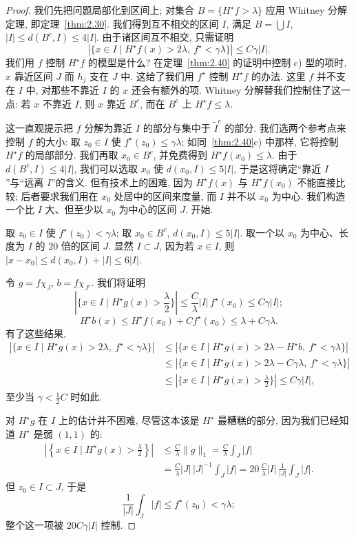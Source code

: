 \begin{proof}
我们先把问题局部化到区间上; 对集合 $B=\{H^{\star}f>\lambda\}$ 应用 Whitney 分解定理, 即定理~\ref{thm:2.30}. 我们得到互不相交的区间 $I$, 满足 $B=\bigcup I$, $|I|\leq d(B^{c},I)\leq 4|I|$. 由于诸区间互不相交, 只需证明
\[
|\{x\in I \mid H^{\star}f(x)>2\lambda,\ f^{\star}<\gamma\lambda\}|\leq C\gamma|I|.
\]
我们用 $f$ 控制 $H^{\star}f$ 的模型是什么? 在定理~\ref{thm:2.40} 的证明中控制 c) 型的项时, $x$ 靠近区间 $J$ 而 $h_j$ 支在 $J$ 中. 这给了我们用 $f^{\star}$ 控制 $H^{\star}f$ 的办法. 这里 $f$ 并不支在 $I$ 中, 对那些不靠近 $I$ 的 $x$ 还会有额外的项. Whitney 分解替我们控制住了这一点: 若 $x$ 不靠近 $I$, 则 $x$ 靠近 $B^{c}$, 而在 $B^{c}$ 上 $H^{\star}f\leq\lambda$.

这一直观提示把 $f$ 分解为靠近 $I$ 的部分与集中于 $\tilde{I}^{c}$ 的部分. 我们选两个参考点来控制 $f$ 的大小: 取 $z_0\in I$ 使 $f^{\star}(z_0)\leq\gamma\lambda$; 如同~\ref*{thm:2.40}c) 中那样, 它将控制 $H^{\star}f$ 的局部部分. 我们再取 $x_0\in B^{c}$, 并免费得到 $H^{\star}f(x_0)\leq\lambda$. 由于 $d(B^{c},I)\leq 4|I|$, 我们可以选取 $x_0$ 使 $d(x_0,I)\leq 5|I|$, 于是这将确定``靠近 $I$''与``远离 $I$''的含义. 但有技术上的困难, 因为 $H^{\star}f(x)$ 与 $H^{\star}f(x_0)$ 不能直接比较; 后者要求我们用在 $x_{0}$ 处居中的区间来度量, 而 $I$ 并不以 $x_0$ 为中心. 我们构造一个比 $I$ 大、但至少以 $x_{0}$ 为中心的区间 $J$. 开始.

取 $z_0\in I$ 使 $f^{\star}(z_0)<\gamma\lambda$; 取 $x_0\in B^{c}$, $d(x_0,I)\leq 5|I|$. 取一个以 $x_0$ 为中心、长度为 $I$ 的 $20$ 倍的区间 $J$. 显然 $I\subset J$, 因为若 $x\in I$, 则 $|x-x_{0}|\leq d(x_{0},I)+|I|\leq 6|I|$.

令 $g=f\chi_J$, $b=f\chi_{J^{c}}$. 我们将证明
\[
\left|\{x\in I \mid H^{\star}g(x)>\frac{\lambda}{2}\}\right|\leq\frac{C}{\lambda}|I|\,f^{\star}(x_{0})\leq C\gamma|I|;
\]
\[
H^{\star}b(x)\leq H^{\star}f(x_{0})+C f^{\star}(x_{0})\leq\lambda+C\gamma\lambda.
\]
有了这些结果,
\begin{align*}
|\{x\in I \mid H^{\star}g(x)>2\lambda,\ f^{\star}<\gamma\lambda\}|
&\leq|\{x\in I \mid H^{\star}g(x)>2\lambda-H^{\star}b,\ f^{\star}<\gamma\lambda\}| \\
&\leq|\{x\in I \mid H^{\star}g(x)>2\lambda-C\gamma\lambda,\ f^{\star}<\gamma\lambda\}| \\
&\leq\left|\{x\in I \mid H^{\star}g(x)>\frac{\lambda}{2}\}\right|\leq C\gamma|I|,
\end{align*}
至少当 $\gamma<\frac{1}{2}C$ 时如此.

对 $H^{\star}g$ 在 $I$ 上的估计并不困难, 尽管这本该是 $H^{\star}$ 最糟糕的部分, 因为我们已经知道 $H^{\star}$ 是弱 $(1,1)$ 的:
\begin{align*}
\left|\left\{x\in I \mid H^{\star}g(x)>\frac{\lambda}{2}\right\}\right|
&\leq\frac{C}{\lambda}\|g\|_{1}=\frac{C}{\lambda}\int_{J}|f| \\
&=\frac{C}{\lambda}|J|\,|J|^{-1}\int_{J}|f|
=20\,\frac{C}{\lambda}|I|\,\frac{1}{|J|}\int_{J}|f|.
\end{align*}
但 $z_0\in I\subset J$, 于是
\[
\frac{1}{|J|}\int_{J}|f|\leq f^{\star}(z_{0})<\gamma\lambda;
\]
整个这一项被 $20C\gamma|I|$ 控制.


\end{proof}
